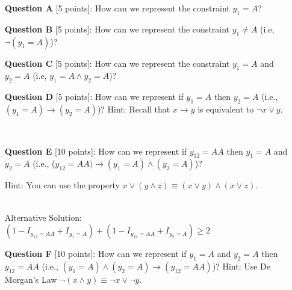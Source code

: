 \begin{itemize}
\item[{\bf Question A}][5 points]: How can we represent the constraint $y_1=A$?

{ }

\item [{\bf Question B}][5 points]: How can we represent the constraint $y_1 \neq A$ (i.e, $\neg (y_1=A)$)?

{ }
 
\item [{\bf Question C}][5 points]: How can we represent
the constraint $y_1=A$ and $y_2 =A$ (i.e, $y_1=A\wedge y_2=A$)? 

{ }

\item [{\bf Question D}][5 points]: How can we represent if $y_1=A$ then $y_2 =A$ (i.e., $(y_1=A) \rightarrow (y_2=A)$)?
Hint: Recall that $x\rightarrow y$ is equivalent to $\neg x \vee y$. 

{ }\\

\item [{\bf Question E}][10 points]: How can we represent
if $y_{12}=AA$ then $y_1 =A$ and $y_2=A$ (i.e., ($y_{12}=AA) \rightarrow (y_1=A) \wedge (y_2 = A)$)?

Hint: You can use the property  $x\vee (y \wedge z) \equiv (x\vee y) \wedge (x \vee z)$.

{ }\\

{\color{blue} Alternative Solution: \\
{$(1 - I_{y_12=AA} + I_{y_1=A}) + (1 - I_{y_12=AA} + I_{y_2=A}) \geq 2 $
} }\\

\item [ {\bf Question F}][10 points]: How can we represent
if  $y_1 =A$ and $y_2=A$ then $y_{12}=AA$ (i.e., $(y_1=A) \wedge (y_2 = A) \rightarrow (y_{12}=AA)$)?
Hint: Use De Morgan's Law  $\neg (x \wedge y) \equiv \neg x \vee \neg y$.

{ }\\

\end{itemize}

